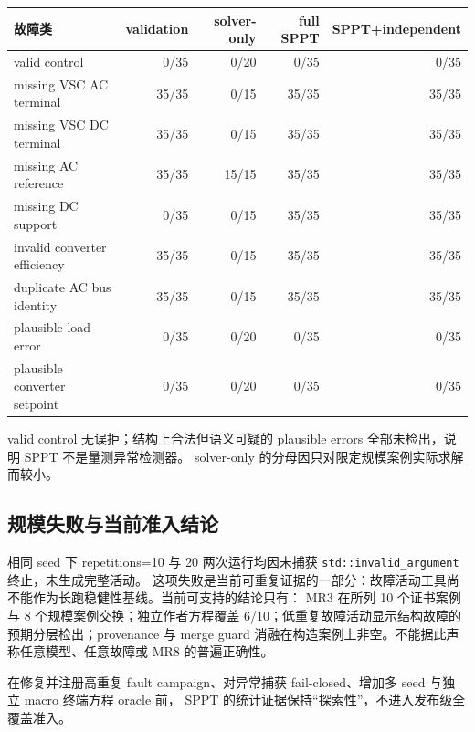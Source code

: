 \begin{center}\footnotesize
\begin{tabular}{@{}lrrrr@{}}\toprule
故障类 & validation & solver-only & full SPPT & SPPT+independent\\\midrule
valid control & 0/35 & 0/20 & 0/35 & 0/35\\
missing VSC AC terminal & 35/35 & 0/15 & 35/35 & 35/35\\
missing VSC DC terminal & 35/35 & 0/15 & 35/35 & 35/35\\
missing AC reference & 35/35 & 15/15 & 35/35 & 35/35\\
missing DC support & 0/35 & 0/15 & 35/35 & 35/35\\
invalid converter efficiency & 35/35 & 0/15 & 35/35 & 35/35\\
duplicate AC bus identity & 35/35 & 0/15 & 35/35 & 35/35\\
plausible load error & 0/35 & 0/20 & 0/35 & 0/35\\
plausible converter setpoint & 0/35 & 0/20 & 0/35 & 0/35\\\bottomrule
\end{tabular}
\end{center}

valid control 无误拒；结构上合法但语义可疑的 plausible errors 全部未检出，说明 SPPT 不是量测异常检测器。
solver-only 的分母因只对限定规模案例实际求解而较小。

\subsection{规模失败与当前准入结论}

相同 seed 下 repetitions=10 与 20 两次运行均因未捕获 \texttt{std::invalid\_argument} 终止，未生成完整活动。
这项失败是当前可重复证据的一部分：故障活动工具尚不能作为长跑稳健性基线。当前可支持的结论只有：
MR3 在所列 10 个证书案例与 8 个规模案例交换；独立作者方程覆盖 6/10；低重复故障活动显示结构故障的
预期分层检出；provenance 与 merge guard 消融在构造案例上非空。不能据此声称任意模型、任意故障或
MR8 的普遍正确性。

\begin{gapnote}
在修复并注册高重复 fault campaign、对异常捕获 fail-closed、增加多 seed 与独立 macro 终端方程 oracle 前，
SPPT 的统计证据保持“探索性”，不进入发布级全覆盖准入。
\end{gapnote}
